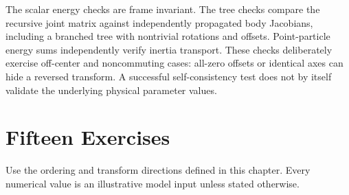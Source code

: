 The scalar energy checks are frame invariant. The tree checks compare the recursive joint matrix against independently propagated body Jacobians, including a branched tree with nontrivial rotations and offsets. Point-particle energy sums independently verify inertia transport. These checks deliberately exercise off-center and noncommuting cases: all-zero offsets or identical axes can hide a reversed transform. A successful self-consistency test does not by itself validate the underlying physical parameter values.

\section{Fifteen Exercises}
\label{sec:spatial_exercises}

Use the ordering and transform directions defined in this chapter. Every numerical value is an illustrative model input unless stated otherwise.

